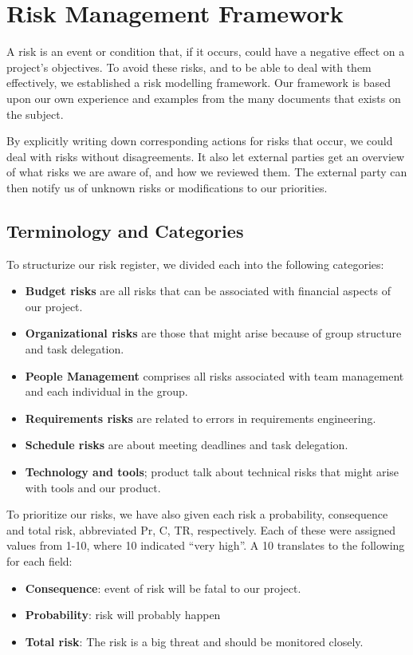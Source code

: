 \chapter{Risk Management Framework}
A risk is an event or condition that, if it occurs, could have a
negative effect on a project's objectives. To avoid these risks, and to be
able to deal with them effectively, we established a risk modelling framework.
Our framework is based upon our own experience and examples from the many
documents that exists on the subject.

By explicitly writing down corresponding actions for risks that occur,
we could deal with risks without disagreements. It also let external
parties get an overview of what risks we are aware of, and how we
reviewed them. The external party can then notify us of unknown risks
or modifications to our priorities. 

\section{Terminology and Categories}

To structurize our risk register, we divided each into the following
categories:
\begin{itemize}
    \item \textbf{Budget risks} are all risks that can be associated with
        financial aspects of our project.
    \item \textbf{Organizational risks} are those that might arise because of
    group structure and task delegation.
    \item \textbf{People Management} comprises all risks associated with team
        management and each individual in the group.
    \item \textbf{Requirements risks} are related to errors in requirements
        engineering.
    \item \textbf{Schedule risks} are about meeting deadlines and task
        delegation.
    \item \textbf{Technology and tools}; product talk about technical risks that
        might arise with tools and our product.
\end{itemize}

To prioritize our risks, we have also given each risk a probability,
consequence and total risk, abbreviated Pr, C, TR, respectively. Each
of these were assigned values from 1-10, where 10 indicated
``very high''. A 10 translates to
the following for each field:
\begin{itemize}
    \item \textbf{Consequence}: event of risk will be fatal to our project.
    \item \textbf{Probability}: risk will probably happen
    \item \textbf{Total risk}: The risk is a big threat and should be monitored closely.
\end{itemize}

